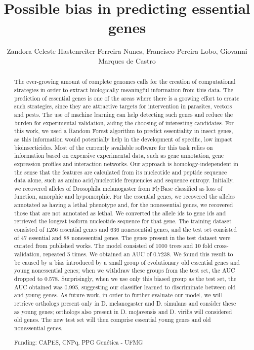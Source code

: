 \documentclass[twoside]{article}
\title{\vspace{-15mm}\fontsize{24pt}{10pt}\selectfont\textbf{ Possible bias in predicting essential genes }} %
\author{ Zandora Celeste Hastenreiter Ferreira Nunes, Francisco Pereira Lobo, Giovanni Marques de Castro }
\affil{ Universidade Federal de Minas Gerais }
\date{}
\begin{document}
  
  
  \maketitle %
  
  
  \thispagestyle{fancy} %
  
  
  \begin{abstract}
  The ever-growing amount of complete genomes calls for the creation of computational strategies in order to extract biologically meaningful information from this data. The prediction of essential genes is one of the areas where there is a growing effort to create such strategies,  since they are attractive targets for intervention in parasites,  vectors and pests. The use of machine learning can help detecting such genes and reduce the burden for experimental validation,  aiding the choosing of interesting candidates. For this work,  we used a Random Forest algorithm to predict essentiality in insect genes,  as this information would potentially help in the development of specific,  low impact bioinsecticides. Most of the currently available software for this task relies on information based on expensive experimental data,  such as gene annotation,  gene expression profiles and interaction networks. Our approach is homology-independent in the sense that the features are calculated from its nucleotide and peptide sequence data alone,  such as amino acid/nucleotide frequencies and sequence entropy. Initially,  we recovered alleles of Drosophila melanogaster from FlyBase classified as loss of function,  amorphic and hypomorphic. For the essential genes,  we recovered the alleles annotated as having a lethal phenotype and,  for the nonessential genes,  we recovered those that are not annotated as lethal. We converted the allele ids to gene ids and retrieved the longest isoform nucleotide sequence for that gene. The training dataset consisted of 1256 essential genes and 636 nonessential genes,  and the test set consisted of 47 essential and 88 nonessential genes. The genes present in the test dataset were curated from published works. The model consisted of 1000 trees and 10 fold cross-validation,  repeated 5 times. We obtained an AUC of 0.7238. We found this result to be caused by a bias introduced by a small group of evolutionary old essential genes and young nonessential genes; when we withdraw these groups from the test set,  the AUC dropped to 0.578. Surprisingly,  when we use only this biased group as the test set,  the AUC obtained was 0.995,  suggesting our classifier learned to discriminate between old and young genes. As future work,  in order to further evaluate our model,  we will retrieve orthologs present only in D. melanogaster and D. simulans and consider these as young genes; orthologs also present in D. mojavensis and D. virilis will considered old genes. The new test set will then comprise essential young genes and old nonessential genes.
  
  Funding: CAPES,  CNPq,  PPG Gen\'etica - UFMG \\ 
  \end{abstract}
  
\end{document}
